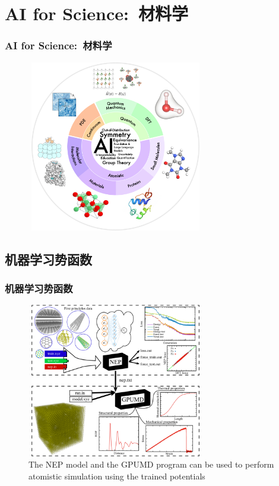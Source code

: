 \section{\rm{AI for Science:}~材料学}
\frame
{
	\frametitle{\textrm{AI for Science:}~材料学}
\begin{figure}[h!]
\vspace*{-0.18in}
\centering
\includegraphics[height=2.95in,width=3.05in]{Figures/AI-for-Science.png}
\label{AI_for_Sciences}
\end{figure}
}

\subsection{机器学习势函数}
\frame
{
	\frametitle{机器学习势函数}
\begin{figure}[h!]
\vspace*{-0.18in}
\centering
\includegraphics[height=2.65in,width=3.05in,viewport=0 0 832 748,clip]{Figures/NEP_GPUMD.png}
\caption{\tiny\textrm{The NEP model and the GPUMD program can be used to perform atomistic simulation using the trained potentials}}%
\label{AI_for_Science:NEP-GPUMD}
\end{figure}
}

